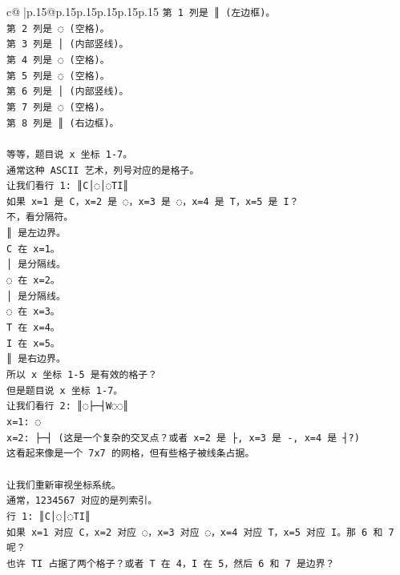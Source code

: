 \documentclass{article}
\begin{document}
{\begin{supertabular}{c@{$\;$}|p{.15\linewidth}@{}p{.15\linewidth}p{.15\linewidth}p{.15\linewidth}p{.15\linewidth}p{.15\linewidth}}
{{{\texttt{第 1 列是 ║ (左边框)。} \\
\texttt{第 2 列是 ◌ (空格)。} \\
\texttt{第 3 列是 │ (内部竖线)。} \\
\texttt{第 4 列是 ◌ (空格)。} \\
\texttt{第 5 列是 ◌ (空格)。} \\
\texttt{第 6 列是 │ (内部竖线)。} \\
\texttt{第 7 列是 ◌ (空格)。} \\
\texttt{第 8 列是 ║ (右边框)。} \\
\\ 
\texttt{等等，题目说 x 坐标 1{-}7。} \\
\texttt{通常这种 ASCII 艺术，列号对应的是格子。} \\
\texttt{让我们看行 1: ║C│◌│◌TI║} \\
\texttt{如果 x=1 是 C，x=2 是 ◌，x=3 是 ◌，x=4 是 T，x=5 是 I？} \\
\texttt{不，看分隔符。} \\
\texttt{║ 是左边界。} \\
\texttt{C 在 x=1。} \\
\texttt{│ 是分隔线。} \\
\texttt{◌ 在 x=2。} \\
\texttt{│ 是分隔线。} \\
\texttt{◌ 在 x=3。} \\
\texttt{T 在 x=4。} \\
\texttt{I 在 x=5。} \\
\texttt{║ 是右边界。} \\
\texttt{所以 x 坐标 1{-}5 是有效的格子？} \\
\texttt{但是题目说 x 坐标 1{-}7。} \\
\texttt{让我们看行 2: ║◌├─┤W◌◌║} \\
\texttt{x=1: ◌} \\
\texttt{x=2: ├─┤ (这是一个复杂的交叉点？或者 x=2 是 ├, x=3 是 {-}, x=4 是 ┤?)} \\
\texttt{这看起来像是一个 7x7 的网格，但有些格子被线条占据。} \\
\\ 
\texttt{让我们重新审视坐标系统。} \\
\texttt{通常，1234567 对应的是列索引。} \\
\texttt{行 1: ║C│◌│◌TI║} \\
\texttt{如果 x=1 对应 C，x=2 对应 ◌，x=3 对应 ◌，x=4 对应 T，x=5 对应 I。那 6 和 7 呢？} \\
\texttt{也许 TI 占据了两个格子？或者 T 在 4，I 在 5，然后 6 和 7 是边界？} \\
}}}
\end{supertabular}}
\end{document}
